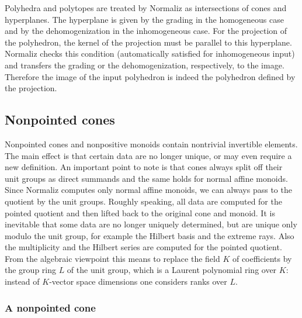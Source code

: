 \documentclass[12pt,a4paper]{scrartcl}
\theoremstyle{definition}
\begin{document}
Polyhedra and polytopes are treated by Normaliz as intersections of cones and hyperplanes. The hyperplane is given by the grading in the homogeneous case and by the dehomogenization in the inhomogeneous case. For the projection of the polyhedron, the kernel of the projection must be parallel to this hyperplane. Normaliz checks this condition (automatically satisfied for inhomogeneous input) and transfers the grading or the dehomogenization, respectively, to the image. Therefore the image of the input polyhedron is indeed the polyhedron defined by the projection.

\subsection{Nonpointed cones}\label{Nonpointed}

Nonpointed cones and nonpositive monoids contain nontrivial invertible elements. The main effect is that certain data are no longer unique, or may even require a new definition. An important point to note is that cones always split off their unit groups as direct summands and the same holds for normal affine monoids. Since Normaliz computes only normal affine monoids, we can always pass to the quotient by the unit groups. Roughly speaking, all data are computed for the pointed quotient and then lifted back to the original cone and monoid. It is inevitable that some data are no longer uniquely determined, but are unique only modulo the unit group, for example the Hilbert basis and the extreme rays. Also the multiplicity and the Hilbert series are computed for the pointed quotient. From the algebraic viewpoint this means to replace the field $K$ of coefficients by the group ring $L$ of the unit group, which is a Laurent polynomial ring over $K$: instead of $K$-vector space dimensions one considers ranks over $L$.

\subsubsection{A nonpointed cone}
\end{document}
